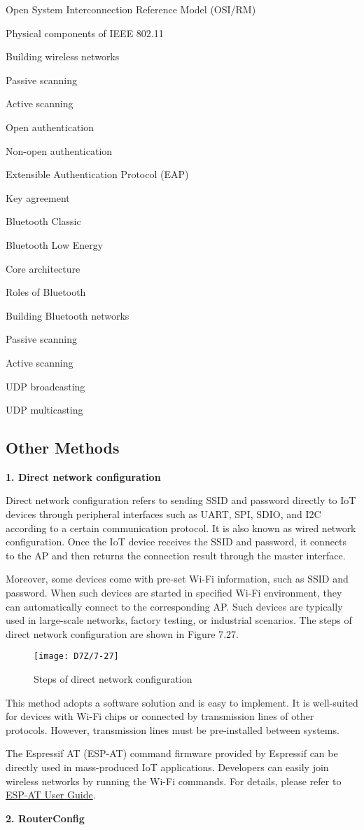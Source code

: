 \documentclass[a4paper,12pt]{book}
\begin{document}
\begin{term}{Open System Interconnection Reference Model (OSI/RM)}
\begin{term}{Physical components of IEEE 802.11}
\begin{term}{Building wireless networks}
\begin{term}{Passive scanning}
\begin{term}{Active scanning}
\begin{term}{Open authentication}
\begin{term}{Non-open authentication}
\begin{term}{Extensible Authentication Protocol (EAP)}
\begin{term}{Key agreement}
\begin{term}{Bluetooth Classic}
\begin{term}{Bluetooth Low Energy}
\begin{term}{Core architecture}
\begin{term}{Roles of Bluetooth}
\begin{term}{Building Bluetooth networks}
\begin{term}{Passive scanning}
\begin{term}{Active scanning}
\begin{term}{UDP broadcasting}
\begin{term}{UDP multicasting}

\subsection{Other Methods}
\textbf{1. Direct network configuration}

Direct network configuration refers to sending SSID and password directly to IoT devices through peripheral interfaces such as UART, SPI, SDIO, and I2C according to a certain communication protocol. It is also known as wired network configuration. Once the IoT device receives the SSID and password, it connects to the AP and then returns the connection result through the master interface.

Moreover, some devices come with pre-set Wi-Fi information, such as SSID and password. When such devices are started in specified Wi-Fi environment, they can automatically connect to the corresponding AP. Such devices are typically used in large-scale networks, factory testing, or industrial scenarios. The steps of direct network configuration are shown in Figure 7.27.

\begin{figure}[!h]
    \centering
    \texttt{[image: D7Z/7-27]}
    \caption{Steps of direct network configuration}
\end{figure}

This method adopts a software solution and is easy to implement. It is well-suited for devices with Wi-Fi chips or connected by transmission lines of other protocols. However, transmission lines must be pre-installed between systems.

The Espressif AT (ESP-AT) command firmware provided by Espressif can be directly used in mass-produced IoT applications. Developers can easily join wireless networks by running the Wi-Fi commands. For details, please refer to \href{https://docs.espressif.com/projects/esp-at/en/latest/esp32/index.html}{ESP-AT User Guide}.

\textbf{2. RouterConfig}


\end{term}
\end{term}
\end{term}
\end{term}
\end{term}
\end{term}
\end{term}
\end{term}
\end{term}
\end{term}
\end{term}
\end{term}
\end{term}
\end{term}
\end{term}
\end{term}
\end{term}
\end{term}
\end{document}
